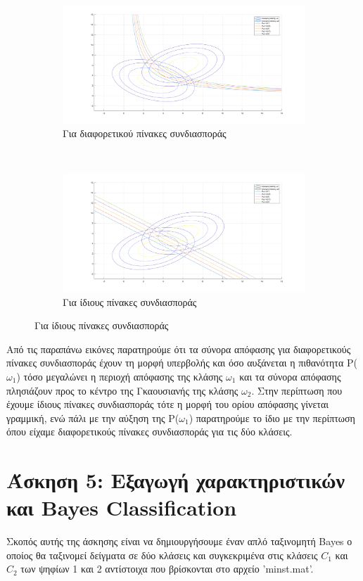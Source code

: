 \documentclass{article}
\begin{document}
	\begin{figure}[h!]
		\centering
		\begin{subfigure}[t]{0.5\textwidth}
			\centering
			\includegraphics[width=\linewidth]{../exercise1_4/images/part_a.png}
			\caption{Για διαφορετικού πίνακες συνδιασποράς}
		\end{subfigure}%
		~
		\begin{subfigure}[t]{0.5\textwidth}
			\centering
			\includegraphics[width=\linewidth]{../exercise1_4/images/part_b.png}
			\caption{Για ίδιους πίνακες συνδιασποράς}
		\end{subfigure}
	\end{figure}

	\noindent
	Από τις παραπάνω εικόνες παρατηρούμε ότι τα σύνορα απόφασης για διαφορετικούς πίνακες συνδιασποράς έχουν τη μορφή υπερβολής και όσο αυξάνεται η πιθανότητα P($ω_{1}$) τόσο μεγαλώνει η περιοχή απόφασης της κλάσης $ω_{1}$ και τα σύνορα απόφασης πλησιάζουν προς το κέντρο της Γκαουσιανής της κλάσης $ω_{2}$. Στην περίπτωση που έχουμε ίδιους πίνακες συνδιασποράς τότε η μορφή του ορίου απόφασης γίνεται γραμμική, ενώ πάλι με την αύξηση της P($ω_{1}$) παρατηρούμε το ίδιο με την περίπτωση όπου είχαμε διαφορετικούς πίνακες συνδιασποράς για τις δύο κλάσεις.
	
	\pagebreak
\section*{Άσκηση 5: Εξαγωγή χαρακτηριστικών και Bayes Classification}
	Σκοπός αυτής της άσκησης είναι να δημιουργήσουμε έναν απλό ταξινομητή Bayes ο οποίος θα ταξινομεί δείγματα σε δύο κλάσεις και συγκεκριμένα στις κλάσεις $C_{1}$ και $C_{2}$ των ψηφίων 1 και 2 αντίστοιχα που βρίσκονται στο αρχείο 'minst.mat'.\\
	
\end{document}
